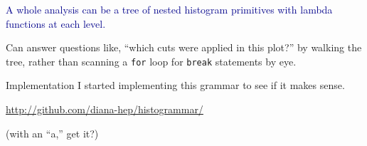 \documentclass{beamer}
\begin{document}
\begin{frame}{}
\textcolor{darkblue}{\large A whole analysis can be a tree of nested histogram primitives with lambda functions at each level.}

\vfill
{}

\vfill
Can answer questions like, ``which cuts were applied in this plot?'' by walking the tree, rather than scanning a {\tt \small for} loop for {\tt \small break} statements by eye.
\end{frame}

\begin{frame}{Implementation}
I started implementing this grammar to see if it makes sense.

\begin{center}
\textcolor{blue}{\url{http://github.com/diana-hep/histogrammar/}}
\end{center}

(with an ``a,'' get it?)
\end{frame}
\end{document}
